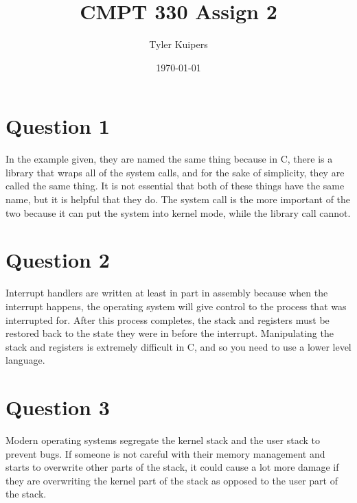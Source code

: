 \documentclass[12pt]{extarticle}
\title{CMPT 330 Assign 2}
\author{Tyler Kuipers}
\date{\today}
\begin{document}
	\maketitle

	\section*{Question 1}
		In the example given, they are named the same thing because in C, there is a library that wraps all of the system calls, and for the sake of simplicity, they are called the same thing.  It is not essential that both of these things have the same name, but it is helpful that they do.  The system call is the more important of the two because it can put the system into kernel mode, while the library call cannot.

	\section*{Question 2}
		Interrupt handlers are written at least in part in assembly because when the interrupt happens, the operating system will give control to the process that was interrupted for.  After this process completes, the stack and registers must be restored back to the state they were in before the interrupt.  Manipulating the stack and registers is extremely difficult in C, and so you need to use a lower level language.

	\section*{Question 3}  
		Modern operating systems segregate the kernel stack and the user stack to prevent bugs.  If someone is not careful with their memory management and starts to overwrite other parts of the stack, it could cause a lot more damage if they are overwriting the kernel part of the stack as opposed to the user part of the stack.
\end{document}
